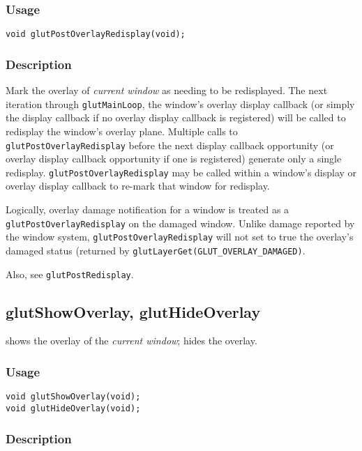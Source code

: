 \subsubsection*{Usage}

\begin{verbatim}
void glutPostOverlayRedisplay(void);
\end{verbatim}

\subsubsection*{Description}

Mark the overlay of {\em current window} as needing to be redisplayed.  The next iteration
through {\tt glutMainLoop}, the window's overlay display callback (or simply the
display callback if no overlay display callback is registered) will be called
to redisplay the window's overlay plane.  Multiple calls to {\tt glutPostOverlayRedisplay}
before the next display callback opportunity (or overlay display callback opportunity
if one is registered) generate only a single
redisplay.  {\tt glutPostOverlayRedisplay} may be called within a window's
display or overlay display callback to re-mark that window for redisplay.

Logically, overlay damage notification for a window is treated as a
{\tt glutPostOverlayRedisplay} on the damaged window.  Unlike damage reported by
the window system, {\tt glutPostOverlayRedisplay} will not set to true the overlay's
damaged status (returned by {\tt glutLayerGet(GLUT\_OVERLAY\_DAMAGED)}.

Also, see {\tt glutPostRedisplay}.

\subsection{glutShowOverlay, glutHideOverlay}

 shows the overlay of the {\em current window};
 hides the overlay.

\subsubsection*{Usage}

\begin{verbatim}
void glutShowOverlay(void);
void glutHideOverlay(void);
\end{verbatim}

\subsubsection*{Description}


